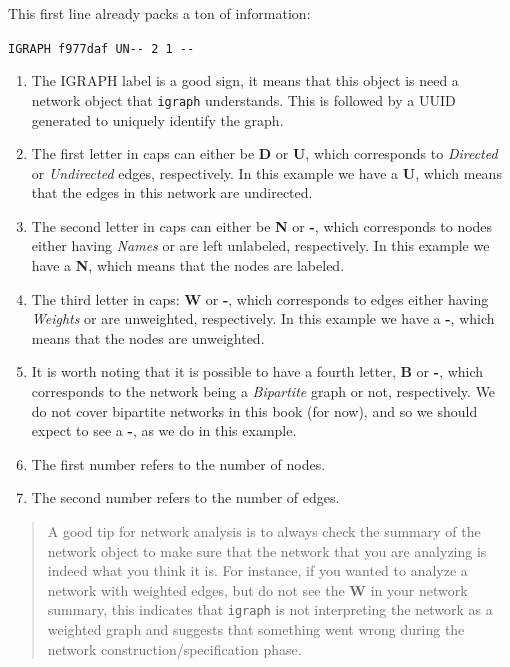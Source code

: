\documentclass[
]{book}
\providecommand{\tightlist}{%
  \setlength{\itemsep}{0pt}\setlength{\parskip}{0pt}}
\begin{document}
This first line already packs a ton of information:

\texttt{IGRAPH\ f977daf\ UN-\/-\ 2\ 1\ -\/-}

\begin{enumerate}
\def\labelenumi{\arabic{enumi}.}
\tightlist
\item
  The IGRAPH label is a good sign, it means that this object is need a network object that \texttt{igraph} understands. This is followed by a UUID generated to uniquely identify the graph.
\item
  The first letter in caps can either be \textbf{D} or \textbf{U}, which corresponds to \emph{Directed} or \emph{Undirected} edges, respectively. In this example we have a \textbf{U}, which means that the edges in this network are undirected.
\item
  The second letter in caps can either be \textbf{N} or \textbf{-}, which corresponds to nodes either having \emph{Names} or are left unlabeled, respectively. In this example we have a \textbf{N}, which means that the nodes are labeled.
\item
  The third letter in caps: \textbf{W} or \textbf{-}, which corresponds to edges either having \emph{Weights} or are unweighted, respectively. In this example we have a \textbf{-}, which means that the nodes are unweighted.
\item
  It is worth noting that it is possible to have a fourth letter, \textbf{B} or \textbf{-}, which corresponds to the network being a \emph{Bipartite} graph or not, respectively. We do not cover bipartite networks in this book (for now), and so we should expect to see a \textbf{-}, as we do in this example.
\item
  The first number refers to the number of nodes.
\item
  The second number refers to the number of edges.
\end{enumerate}

\begin{quote}
A good tip for network analysis is to always check the summary of the network object to make sure that the network that you are analyzing is indeed what you think it is. For instance, if you wanted to analyze a network with weighted edges, but do not see the \textbf{W} in your network summary, this indicates that \texttt{igraph} is not interpreting the network as a weighted graph and suggests that something went wrong during the network construction/specification phase.
\end{quote}
\end{document}
